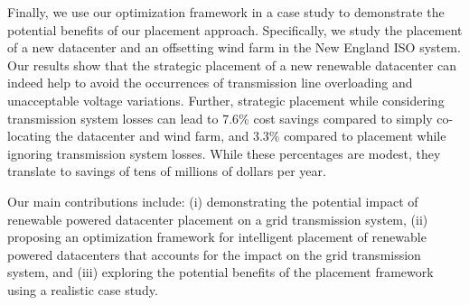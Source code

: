 Finally, we use our optimization framework in a case study to
demonstrate the potential benefits of our placement approach.
Specifically, we study the placement of a new datacenter and an
offsetting wind farm in the New England ISO system.  Our results show
that the strategic placement of a new renewable datacenter can indeed
help to avoid the occurrences of transmission line overloading and
unacceptable voltage variations.  Further, strategic placement while
considering transmission system losses can lead to 7.6\% cost savings
compared to simply co-locating the datacenter and wind farm, and 3.3\%
compared to placement while ignoring transmission system losses.
While these percentages are modest, they translate to savings of tens
of millions of dollars per year.


 Our main contributions include: (i) demonstrating the potential impact of renewable powered datacenter placement on a grid transmission system, (ii) proposing an optimization framework for intelligent placement of renewable powered datacenters that accounts for the impact on the grid transmission system, and (iii) exploring the potential benefits of the placement framework using a realistic case study.

